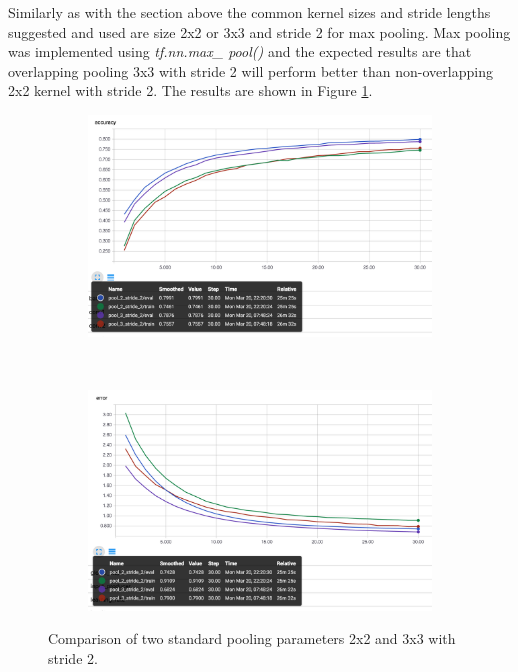 \documentclass[12pt]{article}
\begin{document}
Similarly as with the section above the common kernel sizes and stride lengths suggested\cite{kernel}\cite{inspiration}\cite{stan} and used are size 2x2 or 3x3 and stride 2 for max pooling. Max pooling was implemented using \textit{tf.nn.max\_ pool()} and the expected results are that overlapping pooling 3x3 with stride 2 will perform better than non-overlapping 2x2 kernel with stride 2\cite{frac}. The results are shown in Figure \ref{fig:pool}.

\begin{figure}[ht!]
    \centering
    \begin{subfigure}[t]{0.475\textwidth}
        \centering
        \includegraphics[width=1.0\linewidth]{poola.png}
    \end{subfigure}%
    ~ 
    \begin{subfigure}[t]{0.475\textwidth}
        \centering
        \includegraphics[width=1.0\linewidth]{poole.png}
    \end{subfigure}
    \caption{Comparison of two standard pooling parameters 2x2 and 3x3 with stride 2.}
    \label{fig:pool}
\end{figure}
\end{document}
